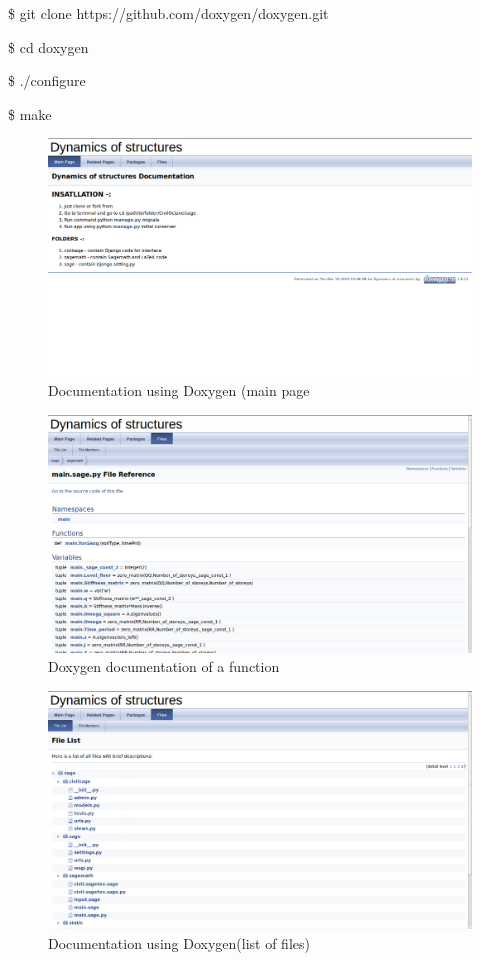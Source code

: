 \hspace{4pt} \$ git clone https://github.com/doxygen/doxygen.git

\hspace{4pt} \$ cd doxygen

\hspace{4pt} \$ ./configure

\hspace{4pt} \$ make

\begin{figure}[H]
\centering \includegraphics[scale=.35]{images/doc.png}
\caption{Documentation using Doxygen (main page}
\end{figure}


\begin{figure}[H]
\centering \includegraphics[scale=.35]{images/doc1.png}
\caption{Doxygen documentation of a function}
\end{figure}
\begin{figure}[H]
\centering \includegraphics[scale=.35]{images/doc2.png}
\caption{Documentation using Doxygen(list of files)}
\end{figure}


